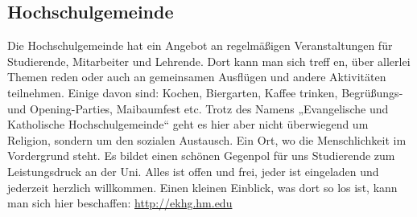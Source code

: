 \subsection{Hochschulgemeinde}
Die Hochschulgemeinde hat ein Angebot an regelmäßigen 
Veranstaltungen für Studierende, Mitarbeiter und Lehrende. Dort kann 
man sich treff en, über allerlei Themen reden oder auch an gemeinsamen 
Ausflügen und andere Aktivitäten teilnehmen. Einige davon sind: 
Kochen, Biergarten, Kaffee trinken, Begrüßungs- und Opening-Parties, 
Maibaumfest etc. 
Trotz des Namens „Evangelische und Katholische Hochschulgemeinde“ 
geht es hier aber nicht überwiegend um Religion, sondern um den 
sozialen Austausch. Ein Ort, wo die Menschlichkeit im Vordergrund 
steht. Es bildet einen schönen Gegenpol für uns Studierende zum 
Leistungsdruck an der Uni. 
Alles ist offen und frei, jeder ist eingeladen und jederzeit herzlich 
willkommen. 
Einen kleinen Einblick, was dort so los ist, kann man sich hier beschaffen: 
\url{http://ekhg.hm.edu} 